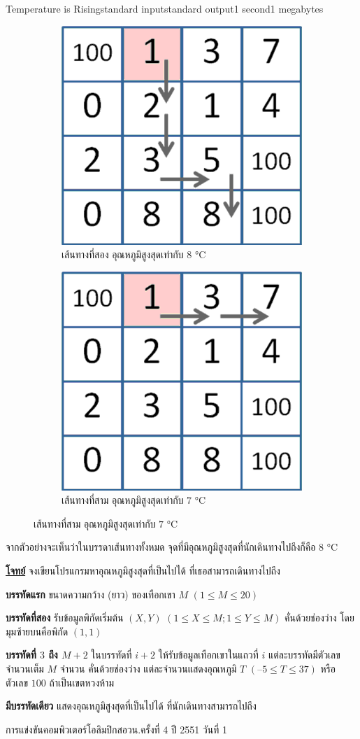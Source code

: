 \documentclass[11pt,a4paper]{article}
\begin{document}
\begin{problem}{Temperature is Rising}{standard input}{standard output}{1 second}{1 megabytes}
\begin{figure}[h]
\centering
\begin{subfigure}{40ex}
\centering
\includegraphics[width=25ex]{../latex/img/1061/1061-3.png}
\caption*{เส้นทางที่สอง อุณหภูมิสูงสุดเท่ากับ $8$ °C}
\end{subfigure}%
\begin{subfigure}{40ex}
\centering
\includegraphics[width=25ex]{../latex/img/1061/1061-4.png}
\caption*{เส้นทางที่สาม อุณหภูมิสูงสุดเท่ากับ $7$ °C}
\end{subfigure}%
\end{figure}

จากตัวอย่างจะเห็นว่าในบรรดาเส้นทางทั้งหมด จุดที่มีอุณหภูมิสูงสุดที่นักเดินทางไปถึงก็คือ $8$ °C

\bigskip
\underline{\textbf{โจทย์}}  จงเขียนโปรแกรมหาอุณหภูมิสูงสุดที่เป็นไปได้ ที่เธอสามารถเดินทางไปถึง

\InputFile

\textbf{บรรทัดแรก} ขนาดความกว้าง (ยาว) ของเทือกเขา $M$ $(1 \leq M \leq 20)$

\textbf{บรรทัดที่สอง} รับข้อมูลพิกัดเริ่มต้น $(X, Y)$ $(1 \leq X \leq M;1 \leq Y \leq M)$ คั่นด้วยช่องว่าง โดยมุมซ้ายบนคือพิกัด $(1, 1)$

\textbf{บรรทัดที่ $3$ ถึง $M+2$} ในบรรทัดที่ $i+2$ ให้รับข้อมูลเทือกเขาในแถวที่ $i$ แต่ละบรรทัดมีตัวเลขจำนวนเต็ม $M$ จำนวน คั่นด้วยช่องว่าง แต่ละจำนวนแสดงอุณหภูมิ $T$ $(–5 \leq T \leq 37)$ หรือตัวเลข $100$ ถ้าเป็นเขตหวงห้าม


\OutputFile

\textbf{มีบรรทัดเดียว} แสดงอุณหภูมิสูงสุดที่เป็นไปได้ ที่นักเดินทางสามารถไปถึง

\Examples

\begin{example}
%
%
%
\end{example}


\Source

การแข่งขันคอมพิวเตอร์โอลิมปิกสอวน.ครั้งที่ 4 ปี 2551 วันที่ 1

\end{problem}
\end{document}
